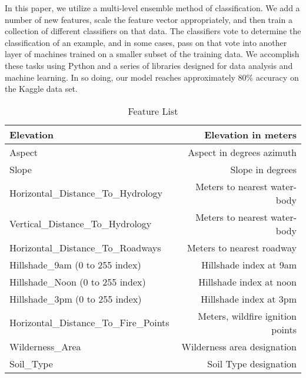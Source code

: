 In this paper, we utilize a multi-level ensemble method of 
classification.  We add a number of new features, scale the feature 
vector appropriately, and then train a collection of different 
classifiers on that data.  The classifiers vote to determine the 
classification of an example, and in some cases, pass on that vote into 
another layer of machines trained on a smaller subset of the training 
data.  We accomplish these tasks using Python and a series of libraries 
designed for data analysis and machine learning.  In so doing, our model 
reaches approximately 80\% accuracy on the Kaggle data set. 






\begin{table}
  \begin{tabular}{ l | r }
    \hline
    Elevation & Elevation in meters \\
    \hline
    Aspect & Aspect in degrees azimuth \\
    \hline
    Slope & Slope in degrees \\
    \hline
    Horizontal\_Distance\_To\_Hydrology & Meters to nearest water-body \\
    \hline
    Vertical\_Distance\_To\_Hydrology & Meters to nearest water-body \\
    \hline
    Horizontal\_Distance\_To\_Roadways & Meters to nearest roadway \\
    \hline
    Hillshade\_9am (0 to 255 index) & Hillshade index at 9am \\
    \hline
    Hillshade\_Noon (0 to 255 index) & Hillshade index at noon \\
    \hline
    Hillshade\_3pm (0 to 255 index) & Hillshade index at 3pm \\
    \hline
    Horizontal\_Distance\_To\_Fire\_Points & Meters, wildfire ignition points \\
    \hline
    Wilderness\_Area & Wilderness area designation \\
    \hline
    Soil\_Type & Soil Type designation \\
    \hline
  \end{tabular}
  \caption{Feature List}
  \label{table:featurelist}
\end{table}



